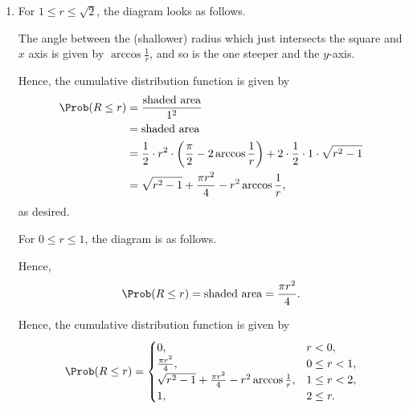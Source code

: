 \Question{\currfilebase}

\begin{enumerate}
    \item For \(1 \leq r \leq \sqrt{2}\), the diagram looks as follows.
          \begin{center}
              
          \end{center}

          The angle between the (shallower) radius which just intersects the square and \(x\) axis is given by \(\arccos \frac{1}{r}\), and so is the one steeper and the \(y\)-axis.

          Hence, the cumulative distribution function is given by
          \begin{align*}
              \Prob(R \leq r) & = \frac{\text{shaded area}}{1^2}                                                                                                    \\
                              & = \text{shaded area}                                                                                                                \\
                              & = \frac{1}{2} \cdot r^2 \cdot \left(\frac{\pi}{2} - 2 \arccos \frac{1}{r}\right) + 2 \cdot \frac{1}{2} \cdot 1 \cdot \sqrt{r^2 - 1} \\
                              & = \sqrt{r^2 - 1} + \frac{\pi r^2}{4} - r^2 \arccos \frac{1}{r},
          \end{align*}
          as desired.

          For \(0 \leq r \leq 1\), the diagram is as follows.
          \begin{center}
              
          \end{center}

          Hence,
          \[
              \Prob(R \leq r) = \text{shaded area} = \frac{\pi r^2}{4}.
          \]

          Hence, the cumulative distribution function is given by
          \[
              \Prob(R \leq r) = \begin{cases}
                  0,                                                            & r < 0,        \\
                  \frac{\pi r^2}{4},                                            & 0 \leq r < 1, \\
                  \sqrt{r^2 - 1} + \frac{\pi r^2}{4} - r^2 \arccos \frac{1}{r}, & 1 \leq r < 2, \\
                  1,                                                            & 2 \leq r.
              \end{cases}
          \]


\end{enumerate}
